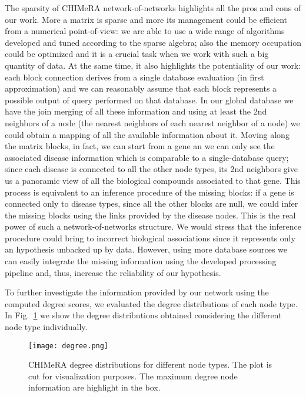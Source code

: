 \documentclass{standalone}
\begin{document}
The sparsity of \textsf{CHIMeRA} network-of-networks highlights all the pros and cons of our work.
More a matrix is sparse and more its management could be efficient from a numerical point-of-view: we are able to use a wide range of algorithms developed and tuned according to the sparse algebra; also the memory occupation could be optimized and it is a crucial task when we work with such a big quantity of data.
At the same time, it also highlights the potentiality of our work: each block connection derives from a single database evaluation (in first approximation) and we can reasonably assume that each block represents a possible output of query performed on that database.
In our global database we have the join merging of all these information and using at least the 2nd neighbors of a node (the nearest neighbors of each nearest neighbor of a node) we could obtain a mapping of all the available information about it.
Moving along the matrix blocks, in fact, we can start from a gene an we can only see the associated disease information which is comparable to a single-database query; since each disease is connected to all the other node types, its 2nd neighbors give us a panoramic view of all the biological compounds associated to that gene.
This process is equivalent to an inference procedure of the missing blocks: if a gene is connected only to disease types, since all the other blocks are null, we could infer the missing blocks using the links provided by the disease nodes.
This is the real power of such a network-of-networks structure.
We would stress that the inference procedure could bring to incorrect biological associations since it represents only an hypothesis unbacked up by data.
However, using more database sources we can easily integrate the missing information using the developed processing pipeline and, thus, increase the reliability of our hypothesis.

To further investigate the information provided by our network using the computed degree scores, we evaluated the degree distributions of each node type.
In Fig.~\ref{fig:chimera_degree} we show the degree distributions obtained considering the different node type individually.

\begin{figure}[htbp]
\centering
\texttt{[image: degree.png]}
\caption{\textsf{CHIMeRA} degree distributions for different node types.
The plot is cut for visualization purposes.
The maximum degree node information are highlight in the box.
}
\label{fig:chimera_degree}
\end{figure}
\end{document}

